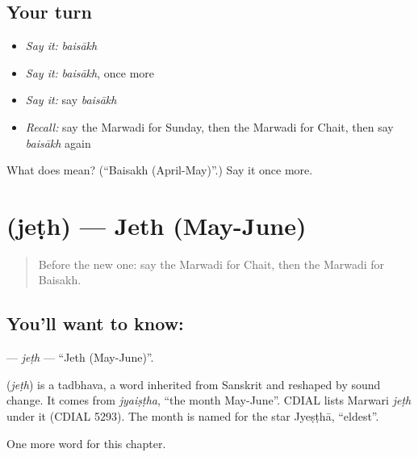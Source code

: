 \subsection*{Your turn}
\begin{itemize}
\raggedright
  \item \emph{Say it:} \emph{baisākh}
  \item \emph{Say it:} \emph{baisākh}, once more
  \item \emph{Say it:} say \emph{baisākh}
  \item \emph{Recall:} say the Marwadi for Sunday, then the Marwadi for Chait, then say \emph{baisākh} again
\end{itemize}

\begin{tcolorbox}[breakable,colback=teal!4,colframe=teal!35!black,title={Before you move on}]
What does  mean? (\textquotedblleft{}Baisakh (April-May)\textquotedblright{}.) Say it once more.
\end{tcolorbox}
\section[\texorpdfstring{\mw{जेठ} (jeṭh)}{जेठ (jeṭh)}]{ (jeṭh) — Jeth (May-June)}

\label{lesson:MW-C92-jeth}



\begin{quote}
Before the new one: say the Marwadi for Chait, then the Marwadi for Baisakh.
\end{quote}

\subsection*{You'll want to know: }
\textbf{} — \emph{jeṭh} — \textquotedblleft{}Jeth (May-June)\textquotedblright{}.

\begin{cousinweb}
\textbf{} (\emph{jeṭh}) is a tadbhava, a word inherited from Sanskrit and reshaped by sound change. It comes from \emph{jyaiṣṭha}, \textquotedblleft{}the month May-June\textquotedblright{}. CDIAL lists Marwari \emph{jeṭh} under it (CDIAL 5293). The month is named for the star Jyeṣṭhā, \textquotedblleft{}eldest\textquotedblright{}.
\end{cousinweb}

\begin{grammarlens}[title={What you've built}]
One more word for this chapter.
\end{grammarlens}


